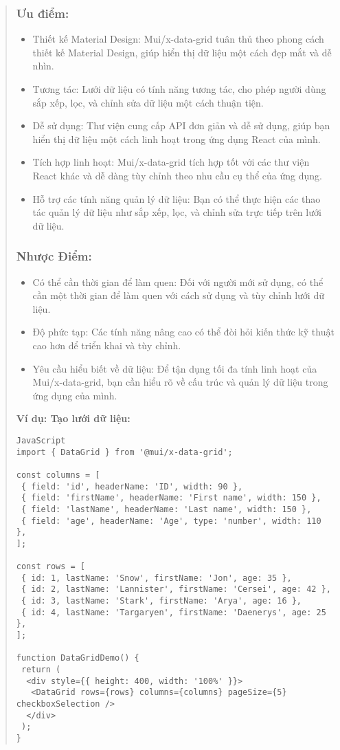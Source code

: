 \begin{quote}
\subsubsection{Ưu điểm:}
\begin{itemize}
  \item Thiết kế Material Design: Mui/x-data-grid tuân thủ theo phong cách thiết kế Material Design, giúp hiển thị dữ liệu một cách đẹp mắt và dễ nhìn.
  \item Tương tác: Lưới dữ liệu có tính năng tương tác, cho phép người dùng sắp xếp, lọc, và chỉnh sửa dữ liệu một cách thuận tiện.
  \item Dễ sử dụng: Thư viện cung cấp API đơn giản và dễ sử dụng, giúp bạn hiển thị dữ liệu một cách linh hoạt trong ứng dụng React của mình.
  \item Tích hợp linh hoạt: Mui/x-data-grid tích hợp tốt với các thư viện React khác và dễ dàng tùy chỉnh theo nhu cầu cụ thể của ứng dụng.
  \item Hỗ trợ các tính năng quản lý dữ liệu: Bạn có thể thực hiện các thao tác quản lý dữ liệu như sắp xếp, lọc, và chỉnh sửa trực tiếp trên lưới dữ liệu.
\end{itemize}

\subsubsection{Nhược Điểm:}
\begin{itemize}
  \item Có thể cần thời gian để làm quen: Đối với người mới sử dụng, có thể cần một thời gian để làm quen với cách sử dụng và tùy chỉnh lưới dữ liệu.
  \item Độ phức tạp: Các tính năng nâng cao có thể đòi hỏi kiến thức kỹ thuật cao hơn để triển khai và tùy chỉnh.
  \item Yêu cầu hiểu biết về dữ liệu: Để tận dụng tối đa tính linh hoạt của Mui/x-data-grid, bạn cần hiểu rõ về cấu trúc và quản lý dữ liệu trong ứng dụng của mình.
\end{itemize}

\textbf{Ví dụ: Tạo lưới dữ liệu:}
\begin{lstlisting}
JavaScript
import { DataGrid } from '@mui/x-data-grid';

const columns = [
 { field: 'id', headerName: 'ID', width: 90 },
 { field: 'firstName', headerName: 'First name', width: 150 },
 { field: 'lastName', headerName: 'Last name', width: 150 },
 { field: 'age', headerName: 'Age', type: 'number', width: 110 },
];

const rows = [
 { id: 1, lastName: 'Snow', firstName: 'Jon', age: 35 },
 { id: 2, lastName: 'Lannister', firstName: 'Cersei', age: 42 },
 { id: 3, lastName: 'Stark', firstName: 'Arya', age: 16 },
 { id: 4, lastName: 'Targaryen', firstName: 'Daenerys', age: 25 },
];

function DataGridDemo() {
 return (
  <div style={{ height: 400, width: '100%' }}>
   <DataGrid rows={rows} columns={columns} pageSize={5} checkboxSelection />
  </div>
 );
}
\end{lstlisting}
\end{quote}


